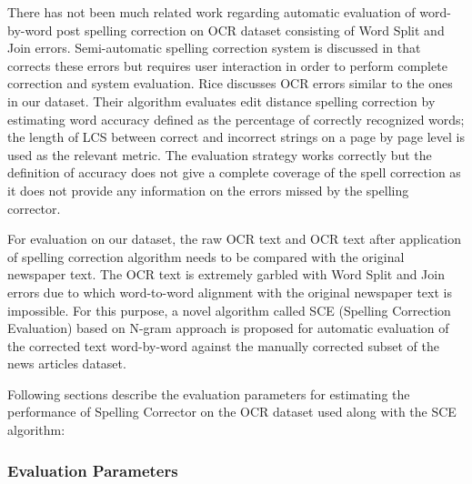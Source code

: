 \documentclass[letterpaper,11pt]{report}
\begin{document}
There has not been much related work regarding automatic evaluation of word-by-word post spelling correction on OCR dataset consisting of Word Split and Join errors. Semi-automatic spelling correction system is discussed in \cite{taghva2001ocrspell} that corrects these errors but requires user interaction in order to perform complete correction and system evaluation. Rice\cite{rice1996measuring} discusses OCR errors similar to the ones in our dataset. Their algorithm evaluates edit distance spelling correction by estimating word accuracy defined as the percentage of correctly recognized words; the length of LCS between correct and incorrect strings on a page by page level is used as the relevant metric. The evaluation strategy works correctly but the definition of accuracy does not give a complete coverage of the spell correction as it does not provide any information on the errors missed by the spelling corrector.

For evaluation on our dataset, the raw OCR text and OCR text after application of spelling correction algorithm needs to be compared with the original newspaper text. The OCR text is extremely garbled with Word Split and Join errors due to which word-to-word alignment with the original newspaper text is impossible. For this purpose, a novel algorithm called SCE (Spelling Correction Evaluation) based on N-gram approach is proposed for automatic evaluation of the corrected text word-by-word against the manually corrected subset of the news articles dataset. 

Following sections describe the evaluation parameters for estimating the performance of Spelling Corrector on the OCR dataset used along with the SCE algorithm:

\subsubsection{Evaluation Parameters}
\end{document}
